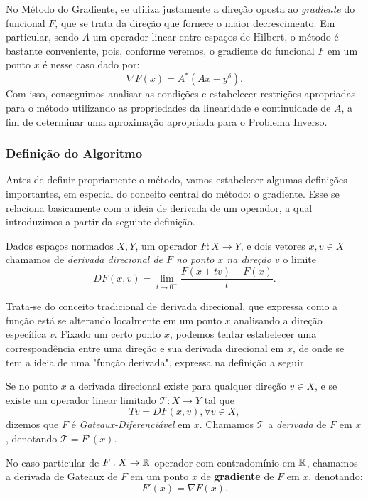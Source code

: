 No Método do Gradiente, se utiliza justamente a direção oposta ao \textit{gradiente} do funcional $F$, que se trata da direção que fornece o maior decrescimento.  Em particular, sendo $A$ um operador linear entre espaços de Hilbert, o método é bastante conveniente, pois, conforme veremos, o gradiente do funcional $F$ em um ponto $x$ é nesse caso dado por:
\[
\nabla F(x) = A^*(Ax-y^\delta).
\]
Com isso, conseguimos analisar as condições e estabelecer restrições apropriadas para o método utilizando as propriedades da linearidade e continuidade de $A$, a fim de determinar uma aproximação apropriada para o Problema Inverso.

\subsubsection{Definição do Algoritmo}

Antes de definir propriamente o método, vamos estabelecer algumas definições importantes, em especial do conceito central do método: o gradiente. Esse se relaciona basicamente com a ideia de derivada de um operador, a qual introduzimos a partir da seguinte definição.

\begin{defin}
    Dados espaços normados $X, Y$, um operador $F:X \to Y$, e dois vetores $x,v\in X$ chamamos de \textit{derivada direcional de $F$ no ponto $x$ na direção $v$} o limite
    \[
        DF(x,v) = \lim_{t\to 0^+} \frac{F(x+tv) - F(x)}{t}.
    \]
\end{defin}


Trata-se do conceito tradicional de derivada direcional, que expressa como a função está se alterando localmente em um ponto $x$ analisando a direção específica $v$. Fixado um certo ponto $x$, podemos tentar estabelecer uma correspondência entre uma direção e sua derivada direcional em $x$, de onde se tem a ideia de uma "função derivada", expressa na definição a seguir.

\begin{defin}
    Se no ponto $x$ a derivada direcional existe para qualquer direção $v\in X$, e se existe um operador linear limitado $\mathcal T: X \to Y$ tal que 
    \[
        Tv = DF(x,v), \forall v \in X,
    \]
    dizemos que $F$ é \textit{Gateaux-Diferenciável} em $x$. Chamamos $\mathcal T$ a \textit{derivada} de $F$ em $x$, denotando $\mathcal{T} = F'(x)$.
\end{defin}
\begin{obs}
    No caso particular de $F:X\to \mathbb{R}$ operador com contradomínio em $\mathbb{R}$, chamamos a derivada de Gateaux de $F$ em um ponto $x$ de \textbf{gradiente} de $F$ em $x$, denotando:
    \[ 
        F'(x) = \nabla F(x).
    \]
\end{obs}

